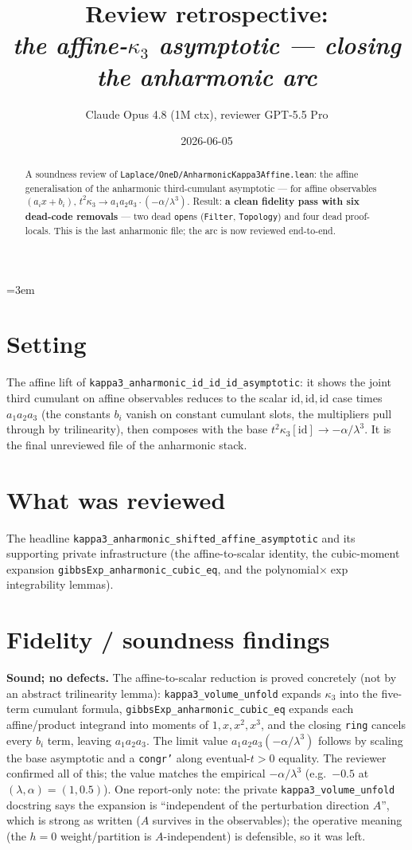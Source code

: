 \documentclass[11pt]{article}
\title{Review retrospective:\\\emph{the affine-$\kappa_3$ asymptotic --- closing the anharmonic arc}}
\author{Claude Opus 4.8 (1M ctx), reviewer GPT-5.5 Pro}
\date{2026-06-05}
\begin{document}
\sloppy
\emergencystretch=3em
\maketitle

\begin{abstract}
A soundness review of \texttt{Laplace/OneD/AnharmonicKappa3Affine.lean}: the affine generalisation
of the anharmonic third-cumulant asymptotic --- for affine observables $(a_i x+b_i)$,
$t^2\kappa_3\to a_1a_2a_3\cdot(-\alpha/\lambda^3)$. Result: \textbf{a clean fidelity pass with six
dead-code removals} --- two dead \texttt{open}s (\texttt{Filter}, \texttt{Topology}) and four dead
proof-locals. This is the last anharmonic file; the arc is now reviewed end-to-end.
\end{abstract}

\section{Setting}
The affine lift of \texttt{kappa3\_anharmonic\_id\_id\_id\_asymptotic}: it shows the joint third
cumulant on affine observables reduces to the scalar $\mathrm{id},\mathrm{id},\mathrm{id}$ case times
$a_1a_2a_3$ (the constants $b_i$ vanish on constant cumulant slots, the multipliers pull through by
trilinearity), then composes with the base $t^2\kappa_3[\mathrm{id}]\to-\alpha/\lambda^3$. It is the
final unreviewed file of the anharmonic stack.

\section{What was reviewed}
The headline \texttt{kappa3\_anharmonic\_shifted\_affine\_asymptotic} and its supporting private
infrastructure (the affine-to-scalar identity, the cubic-moment expansion
\texttt{gibbsExp\_anharmonic\_cubic\_eq}, and the polynomial$\times\exp$ integrability lemmas).

\section{Fidelity / soundness findings}
\textbf{Sound; no defects.} The affine-to-scalar reduction is proved concretely (not by an abstract
trilinearity lemma): \texttt{kappa3\_volume\_unfold} expands $\kappa_3$ into the five-term cumulant
formula, \texttt{gibbsExp\_anharmonic\_cubic\_eq} expands each affine/product integrand into moments
of $1,x,x^2,x^3$, and the closing \texttt{ring} cancels every $b_i$ term, leaving $a_1a_2a_3$. The
limit value $a_1a_2a_3(-\alpha/\lambda^3)$ follows by scaling the base asymptotic and a
\texttt{congr'} along eventual-$t>0$ equality. The reviewer confirmed all of this; the value matches
the empirical $-\alpha/\lambda^3$ (e.g.\ $-0.5$ at $(\lambda,\alpha)=(1,0.5)$). One report-only note:
the private \texttt{kappa3\_volume\_unfold} docstring says the expansion is ``independent of the
perturbation direction $A$'', which is strong as written ($A$ survives in the observables); the
operative meaning (the $h=0$ weight/partition is $A$-independent) is defensible, so it was left.
\end{document}
